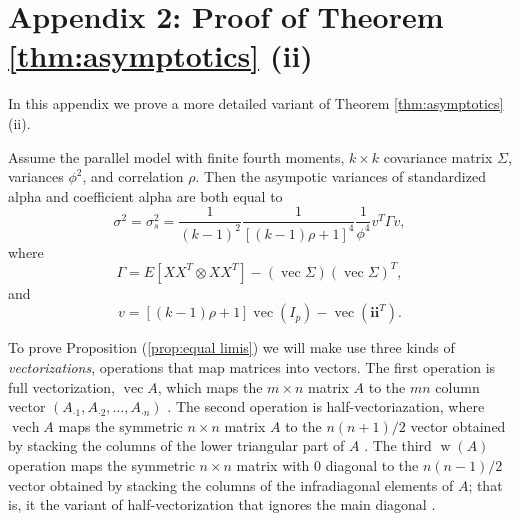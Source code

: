 \documentclass[twoside]{article}
\DeclareMathOperator{\vvec}{vec}
\DeclareMathOperator{\vech}{vech}
\DeclareMathOperator{\w}{w}
\begin{document}
\clearpage
\section*{Appendix 2: Proof of Theorem \ref{thm:asymptotics} (ii)}
\label{appendix 2}

In this appendix we prove a more detailed variant of Theorem \ref{thm:asymptotics} (ii).
\begin{prop}
\label{prop:equal limis}Assume the parallel model with finite fourth
moments, $k\times k$ covariance matrix $\Sigma$, variances $\phi^{2}$,
and correlation $\rho$. Then the asympotic variances of standardized
alpha and coefficient alpha are both equal to 
\begin{equation}
\sigma^{2}=\sigma_{s}^{2}=\frac{1}{(k-1)^{2}}\frac{1}{[(k-1)\rho+1]^{4}}\frac{1}{\phi^{4}}v^{T}\Gamma v,\label{eq:asymptotic variance-1}
\end{equation}
where 
\begin{equation}
\nonumber
\Gamma = E[XX^{T}\otimes XX^{T}]-(\vvec\Sigma)(\vvec\Sigma)^{T},
\end{equation}
 and
\[
v=[(k-1)\rho+1]\vvec(I_{p})-\vvec(\mathbf{i}\mathbf{i}^{T}).
\]
\end{prop}

To prove Proposition (\ref{prop:equal limis}) we will make use three
kinds of \emph{vectorizations}, operations that map matrices into
vectors. The first operation is full vectorization, $\vvec A$, which
maps the $m\times n$ matrix $A$ to the $mn$ column vector $(A_{\cdot1},A_{\cdot2},\ldots,A_{\cdot n})$
\citep[Chapter 2.4]{Magnus2019-cz}. The second operation is half-vectoriazation,
where $\vech A$ maps the symmetric $n\times n$ matrix $A$ to the
$n(n+1)/2$ vector obtained by stacking the columns of the lower triangular
part of $A$ \citep[Chapter 3.8]{Magnus2019-cz}. The third $\w(A)$
operation maps the symmetric $n\times n$ matrix with $0$ diagonal
to the $n(n-1)/2$ vector obtained by stacking the columns of the
infradiagonal elements of $A$; that is, it the variant of half-vectorization
that ignores the main diagonal \citep{Neudecker1996-fu}. 
\end{document}
